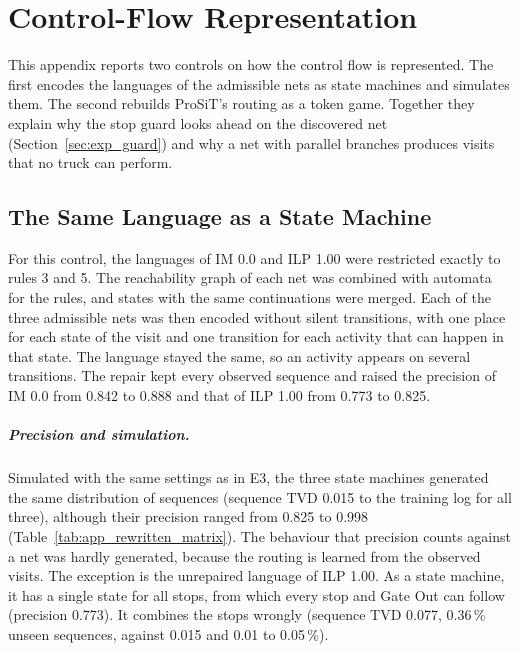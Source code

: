 \chapter{Control-Flow Representation}
\label{app:replica}
\label{app:rewritten}

This appendix reports two controls on how the control flow is represented. The
first encodes the languages of the admissible nets as state machines and
simulates them. The second rebuilds ProSiT's routing as a token game. Together
they explain why the stop guard looks ahead on the discovered net
(Section~\ref{sec:exp_guard}) and why a net with parallel branches produces visits
that no truck can perform.

\section{The Same Language as a State Machine}
\label{app:rewritten_repair}
For this control, the languages of IM 0.0 and ILP 1.00 were restricted exactly to
rules 3 and 5.
The reachability graph of each net was combined with automata for the rules, and
states with the same continuations were merged. Each of the three admissible nets
was then encoded without silent transitions, with one place for each state of
the visit and one transition for each activity that can happen in that state. The
language stayed the same, so an activity appears on several transitions.
The repair kept every observed sequence and raised the precision of IM 0.0 from
0.842 to 0.888 and that of ILP 1.00 from 0.773 to 0.825.


\paragraph{Precision and simulation.} Simulated with the same settings as in E3,
the three state machines generated the same distribution of sequences (sequence
TVD 0.015 to the training log for all three), although their precision ranged
from 0.825 to 0.998 (Table~\ref{tab:app_rewritten_matrix}). The behaviour that
precision counts against a net was hardly generated, because the routing is
learned from the observed visits. The exception is the unrepaired language of
ILP 1.00. As a state machine, it has a single state for all stops, from which every stop
and Gate Out can follow (precision 0.773). It combines the stops wrongly
(sequence TVD 0.077, 0.36\,\% unseen sequences, against 0.015 and 0.01 to
0.05\,\%).

